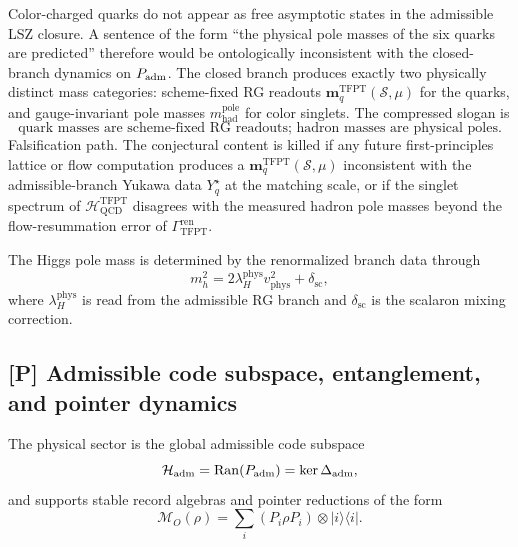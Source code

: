 \begin{remark}
Color-charged quarks do not appear as free asymptotic states in the admissible LSZ closure. A
sentence of the form ``the physical pole masses of the six quarks are predicted'' therefore would be
ontologically inconsistent with the closed-branch dynamics on $P_{\mathrm{adm}}$. The closed branch produces
exactly two physically distinct mass categories: scheme-fixed RG readouts
$\mathbf m_q^{\mathrm{TFPT}}(\mathcal S,\mu)$ for the quarks, and gauge-invariant pole masses
$m_{\mathrm{had}}^{\mathrm{pole}}$ for color singlets. The compressed slogan is
\[
\boxed{\text{quark masses are scheme-fixed RG readouts; hadron masses are physical poles.}}
\]
Falsification path. The conjectural content is killed if any future first-principles lattice or
flow computation produces a $\mathbf m_q^{\mathrm{TFPT}}(\mathcal S,\mu)$ inconsistent with the
admissible-branch Yukawa data $Y_q^\star$ at the matching scale, or if the singlet spectrum of
$\mathcal H_{\mathrm{QCD}}^{\mathrm{TFPT}}$ disagrees with the measured hadron pole masses beyond the
flow-resummation error of $\Gamma_{\mathrm{TFPT}}^{\mathrm{ren}}$.
\end{remark}

\begin{conjecture}
\label{thm:higgs_pole_readout_rg_branch}
The Higgs pole mass is determined by the renormalized branch data through
\[
m_h^2=2\lambda_H^{\mathrm{phys}}v_{\mathrm{phys}}^2+\delta_{\mathrm{sc}},
\]
where \(\lambda_H^{\mathrm{phys}}\) is read from the admissible RG branch and
\(\delta_{\mathrm{sc}}\) is the scalaron mixing correction.
\end{conjecture}

\subsection{[P] Admissible code subspace, entanglement, and pointer dynamics}

\begin{conjecture}
\label{prop:global_admissible_code_subspace}
The physical sector is the global admissible code subspace
\[
\mathcal H_{\mathrm{adm}}=\operatorname{Ran}(P_{\mathrm{adm}})=\ker\Delta_{\mathrm{adm}},
\]
and supports stable record algebras and pointer reductions of the form
\[
\mathcal M_O(\rho)=\sum_i (P_i\rho P_i)\otimes |i\rangle\langle i|.
\]
\end{conjecture}

